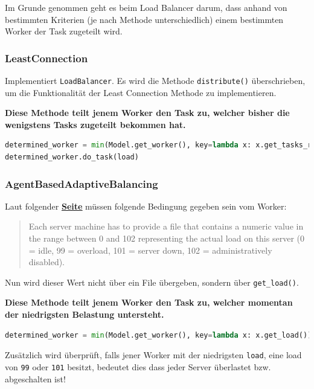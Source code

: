 Im Grunde genommen geht es beim Load Balancer darum, dass anhand von bestimmten Kriterien (je nach Methode unterschiedlich) einem bestimmten Worker der Task zugeteilt wird. 

\subsubsection{LeastConnection}
Implementiert \verb|LoadBalancer|. Es wird die Methode \verb|distribute()| überschrieben, um die Funktionalität der Least Connection Methode zu implementieren.

\textbf{Diese Methode teilt jenem Worker den Task zu, welcher bisher die wenigstens Tasks zugeteilt bekommen hat.} 

\begin{lstlisting}[language=python]
determined_worker = min(Model.get_worker(), key=lambda x: x.get_tasks_received())
determined_worker.do_task(load)
\end{lstlisting}

\subsubsection{AgentBasedAdaptiveBalancing}
Laut folgender \underline{\textbf{\href{https://support.kemptechnologies.com/hc/en-us/articles/115005405746-API-for-Agent-Based-Adaptive-Balancing}{Seite}}} müssen folgende Bedingung gegeben sein vom Worker:

\begin{quote}
Each server machine has to provide a file that contains a numeric value in the range between 0 and 102 representing the actual load on this server (0 = idle, 99 = overload, 101 = server down, 102 = administratively disabled).
\end{quote}

Nun wird dieser Wert nicht über ein File übergeben, sondern über \verb|get_load()|.

\textbf{Diese Methode teilt jenem Worker den Task zu, welcher momentan der niedrigsten Belastung untersteht.}

\begin{lstlisting}[language=python]
determined_worker = min(Model.get_worker(), key=lambda x: x.get_load())
\end{lstlisting}

Zusätzlich wird überprüft, falls jener Worker mit der niedrigsten \verb|load|, eine load von \verb|99| oder \verb|101| besitzt, bedeutet dies dass jeder Server überlastet bzw. abgeschalten ist!

